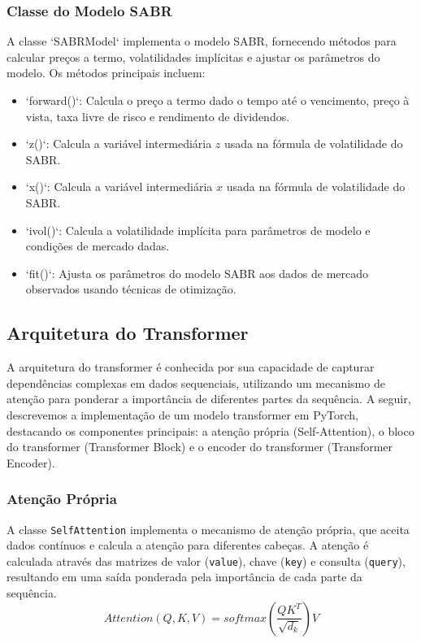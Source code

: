 \subsubsection{Classe do Modelo SABR}

A classe `SABRModel` implementa o modelo SABR, fornecendo métodos para calcular preços a termo, volatilidades implícitas e ajustar os parâmetros do modelo. Os métodos principais incluem:
\begin{itemize}
	\item `forward()`: Calcula o preço a termo dado o tempo até o vencimento, preço à vista, taxa livre de risco e rendimento de dividendos.
	\item `z()`: Calcula a variável intermediária \(z\) usada na fórmula de volatilidade do SABR.
	\item `x()`: Calcula a variável intermediária \(x\) usada na fórmula de volatilidade do SABR.
	\item `ivol()`: Calcula a volatilidade implícita para parâmetros de modelo e condições de mercado dadas.
	\item `fit()`: Ajusta os parâmetros do modelo SABR aos dados de mercado observados usando técnicas de otimização.
\end{itemize}

\subsection{Arquitetura do Transformer}

A arquitetura do transformer é conhecida por sua capacidade de capturar dependências complexas em dados sequenciais, utilizando um mecanismo de atenção para ponderar a importância de diferentes partes da sequência. A seguir, descrevemos a implementação de um modelo transformer em PyTorch, destacando os componentes principais: a atenção própria (Self-Attention), o bloco do transformer (Transformer Block) e o encoder do transformer (Transformer Encoder).

\subsubsection{Atenção Própria}

A classe \texttt{SelfAttention} implementa o mecanismo de atenção própria, que aceita dados contínuos e calcula a atenção para diferentes cabeças. A atenção é calculada através das matrizes de valor (\texttt{value}), chave (\texttt{key}) e consulta (\texttt{query}), resultando em uma saída ponderada pela importância de cada parte da sequência. 
\begin{equation}
	\textit{Attention}(Q, K, V) = \textit{softmax}\left(\frac{QK^T}{\sqrt{d_k}}\right)V
\end{equation}

